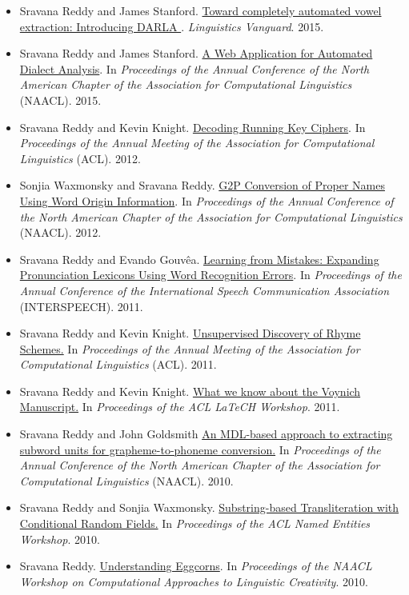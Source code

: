 \documentclass[10.5pt,letterpaper]{article}
\begin{document}
\begin{itemize}

\item Sravana Reddy and James Stanford. \ul{Toward completely automated vowel extraction: Introducing DARLA
}. {\em Linguistics Vanguard}. 2015.

\item Sravana Reddy and James Stanford. \ul{A Web Application for Automated Dialect Analysis}. In {\em Proceedings of the Annual Conference of the North American Chapter of the Association for Computational Linguistics} (NAACL). 2015.

\item Sravana Reddy and Kevin Knight. \ul{Decoding Running Key Ciphers}. In {\itshape Proceedings of the Annual Meeting of the Association for Computational Linguistics} (ACL). 2012.

\item Sonjia Waxmonsky and Sravana Reddy. \ul{G2P Conversion of Proper Names Using Word Origin Information}. In {\itshape Proceedings of the Annual Conference of the North American Chapter of the Association for Computational Linguistics} (NAACL). 2012.

\item Sravana Reddy and Evando Gouv\^ea. \ul{Learning from Mistakes: Expanding Pronunciation Lexicons Using Word Recognition Errors}. In {\itshape Proceedings of the Annual Conference of the International Speech Communication Association} (INTERSPEECH). 2011.

\item Sravana Reddy and Kevin Knight. \ul{Unsupervised Discovery of Rhyme Schemes.} In {\itshape Proceedings of the Annual Meeting of the Association for Computational Linguistics} (ACL). 2011.

\item Sravana Reddy and Kevin Knight. \ul{What we know about the Voynich Manuscript.} In {\itshape Proceedings of the ACL LaTeCH Workshop}. 2011.

\item Sravana Reddy and John Goldsmith  \ul{An MDL-based approach to extracting subword units for grapheme-to-phoneme conversion.} In {\itshape Proceedings of the Annual Conference of the North American Chapter of the Association for Computational Linguistics} (NAACL). 2010.

\item Sravana Reddy and Sonjia Waxmonsky.  \ul{Substring-based Transliteration with Conditional Random Fields.} In {\itshape Proceedings of the ACL Named Entities Workshop}. 2010.

\item Sravana Reddy. \ul{Understanding Eggcorns}. In {\itshape Proceedings of the NAACL Workshop on Computational Approaches to Linguistic Creativity}. 2010.


\end{itemize}
\end{document}
